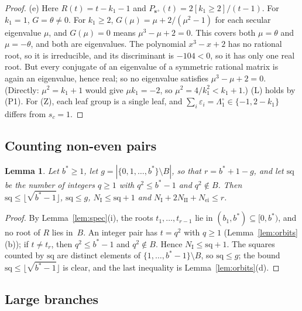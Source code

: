 \documentclass[11pt]{article}
\numberwithin{equation}{section}
\newtheorem{lemma}{Lemma}[section]
\theoremstyle{remark}
\newcommand{\s}{\mathbf s}
\newcommand{\NI}{N_{\mathrm I}}
\newcommand{\NII}{N_{\mathrm{II}}}
\newcommand{\Nei}{N_{\mathrm{ei}}}
\newcommand{\sq}{\mathrm{sq}}
\begin{document}
\begin{proof}
(e) Here $R(t)=t-k_1-1$ and $P_{\s^+}(t)=2[k_1\ge2]/(t-1)$. For $k_1=1$,
$G=\theta\ne0$. For $k_1\ge2$, $G(\mu)=\mu+2/(\mu^2-1)$ for each secular
eigenvalue $\mu$, and $G(\mu)=0$ means $\mu^3-\mu+2=0$. This covers both
$\mu=\theta$ and $\mu=-\theta$, and both are eigenvalues. The polynomial
$x^3-x+2$ has no rational root, so it is irreducible, and its discriminant is
$-104<0$, so it has only one real root. But every conjugate of an eigenvalue of
a symmetric rational matrix is again an eigenvalue, hence real; so no
eigenvalue satisfies $\mu^3-\mu+2=0$. (Directly: $\mu^2=k_1+1$ would give
$\mu k_1=-2$, so $\mu^2=4/k_1^2<k_1+1$.) (L) holds by (P1). For (Z), each leaf group is a
single leaf, and $\sum_i\varepsilon_i=\Lambda^\circ_1\in\{-1,2-k_1\}$ differs
from $s_c=1$.
\end{proof}

\subsection{Counting non-even pairs}

\begin{lemma}\label{lem:count}
Let $b^*\ge1$, let $g=|\{0,1,\dots,b^*\}\setminus B|$, so that $r=b^*+1-g$, and
let $\sq$ be the number of integers $q\ge1$ with $q^2\le b^*-1$ and
$q^2\notin B$. Then $\sq\le\lfloor\sqrt{b^*-1}\rfloor$, $\sq\le g$,
$\NI\le\sq+1$ and $\NI+2\NII+\Nei\le r$.
\end{lemma}
\begin{proof}
By Lemma~\ref{lem:spec}(i), the roots $t_1,\dots,t_{r-1}$ lie in
$(b_1,b^*)\subseteq[0,b^*)$, and no root of $R$ lies in~$B$. An integer pair has
$t=q^2$ with $q\ge1$ (Lemma~\ref{lem:orbits}(b)); if $t\ne t_r$, then
$q^2\le b^*-1$ and $q^2\notin B$. Hence $\NI\le\sq+1$. The squares counted by
$\sq$ are distinct elements of $\{1,\dots,b^*-1\}\setminus B$, so $\sq\le g$;
the bound $\sq\le\lfloor\sqrt{b^*-1}\rfloor$ is clear, and the last inequality
is Lemma~\ref{lem:orbits}(d).
\end{proof}

\subsection{Large branches}
\end{document}
